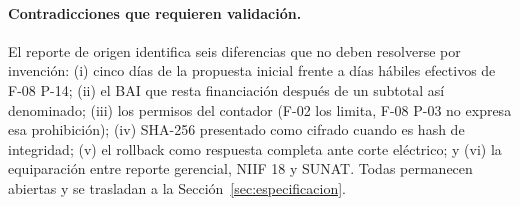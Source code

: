 \paragraph{Contradicciones que requieren validación.} El reporte de origen
identifica seis diferencias que no deben resolverse por invención:
(i) cinco días de la propuesta inicial frente a días hábiles efectivos de
F-08 P-14; (ii) el BAI que resta financiación después de un subtotal así
denominado; (iii) los permisos del contador (F-02 los limita, F-08 P-03 no
expresa esa prohibición); (iv) SHA-256 presentado como cifrado cuando es
hash de integridad; (v) el rollback como respuesta completa ante corte
eléctrico; y (vi) la equiparación entre reporte gerencial, NIIF 18 y SUNAT.
Todas permanecen abiertas y se trasladan a la Sección~\ref{sec:especificacion}.
